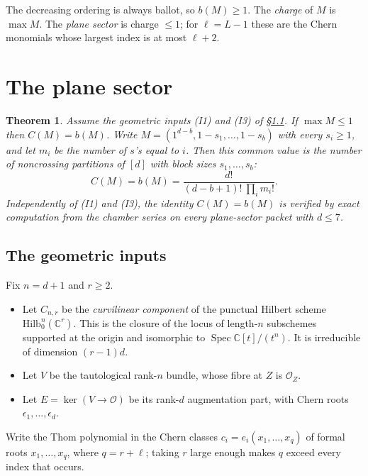 \documentclass[11pt,a4paper]{article}
\theoremstyle{plain}
\newtheorem{theorem}{Theorem}
\theoremstyle{definition}
\theoremstyle{remark}
\begin{document}
The decreasing ordering is always ballot, so $b(M) \ge 1$. The \emph{charge} of $M$ is $\max M$. The
\emph{plane sector} is charge $\le 1$; for $\ell = L - 1$ these are the Chern monomials whose largest
index is at most $\ell + 2$.

\section{The plane sector}

\begin{theorem}\label{thm:plane}
Assume the geometric inputs (I1) and (I3) of \S\ref{sec:inputs}. If $\max M \le 1$ then
$C(M) = b(M)$. Write $M = (1^{d-b}, 1-s_1, \dots, 1-s_b)$ with every $s_i \ge 1$, and let $m_i$ be
the number of $s$'s equal to $i$. Then this common value is the number of noncrossing partitions
of $[d]$ with block sizes $s_1, \dots, s_b$:
\[
  C(M) = b(M) = \frac{d!}{(d-b+1)!\ \prod_i m_i!} .
\]
Independently of (I1) and (I3), the identity $C(M) = b(M)$ is verified by exact computation from
the chamber series on every plane-sector packet with $d \le 7$.
\end{theorem}

\subsection{The geometric inputs}\label{sec:inputs}

Fix $n = d + 1$ and $r \ge 2$.
\begin{itemize}[nosep]
\item Let $C_{n,r}$ be the \emph{curvilinear component} of the punctual Hilbert scheme
  $\mathrm{Hilb}^n_0(\mathbb{C}^r)$. This is the closure of the locus of length-$n$ subschemes
  supported at the origin and isomorphic to $\operatorname{Spec} \mathbb{C}[t]/(t^n)$. It is
  irreducible of dimension $(r-1)d$.
\item Let $V$ be the tautological rank-$n$ bundle, whose fibre at $Z$ is $\mathcal{O}_Z$.
\item Let $E = \ker(V \to \mathcal{O})$ be its rank-$d$ augmentation part, with Chern roots
  $\epsilon_1, \dots, \epsilon_d$.
\end{itemize}
Write the Thom polynomial in the Chern classes $c_i = e_i(x_1, \dots, x_q)$ of formal roots
$x_1, \dots, x_q$, where $q = r + \ell$; taking $r$ large enough makes $q$ exceed every index
that occurs.
\end{document}
